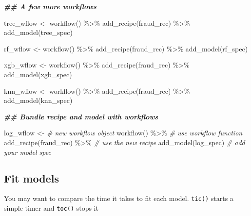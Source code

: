 \documentclass[
]{article}
\newenvironment{Shaded}{\begin{snugshade}}{\end{snugshade}}
\newcommand{\CommentTok}[1]{\textcolor[rgb]{0.56,0.35,0.01}{\textit{#1}}}
\newcommand{\DocumentationTok}[1]{\textcolor[rgb]{0.56,0.35,0.01}{\textbf{\textit{#1}}}}
\newcommand{\FunctionTok}[1]{\textcolor[rgb]{0.00,0.00,0.00}{#1}}
\newcommand{\NormalTok}[1]{#1}
\newcommand{\OtherTok}[1]{\textcolor[rgb]{0.56,0.35,0.01}{#1}}
\newcommand{\SpecialCharTok}[1]{\textcolor[rgb]{0.00,0.00,0.00}{#1}}
\begin{document}
\begin{Shaded}
\begin{Highlighting}[]
\DocumentationTok{\#\# A few more workflows}

\NormalTok{tree\_wflow }\OtherTok{\textless{}{-}}
 \FunctionTok{workflow}\NormalTok{() }\SpecialCharTok{\%\textgreater{}\%}
 \FunctionTok{add\_recipe}\NormalTok{(fraud\_rec) }\SpecialCharTok{\%\textgreater{}\%} 
 \FunctionTok{add\_model}\NormalTok{(tree\_spec) }

\NormalTok{rf\_wflow }\OtherTok{\textless{}{-}}
 \FunctionTok{workflow}\NormalTok{() }\SpecialCharTok{\%\textgreater{}\%}
 \FunctionTok{add\_recipe}\NormalTok{(fraud\_rec) }\SpecialCharTok{\%\textgreater{}\%} 
 \FunctionTok{add\_model}\NormalTok{(rf\_spec) }

\NormalTok{xgb\_wflow }\OtherTok{\textless{}{-}}
 \FunctionTok{workflow}\NormalTok{() }\SpecialCharTok{\%\textgreater{}\%}
 \FunctionTok{add\_recipe}\NormalTok{(fraud\_rec) }\SpecialCharTok{\%\textgreater{}\%} 
 \FunctionTok{add\_model}\NormalTok{(xgb\_spec)}

\NormalTok{knn\_wflow }\OtherTok{\textless{}{-}}
 \FunctionTok{workflow}\NormalTok{() }\SpecialCharTok{\%\textgreater{}\%}
 \FunctionTok{add\_recipe}\NormalTok{(fraud\_rec) }\SpecialCharTok{\%\textgreater{}\%} 
 \FunctionTok{add\_model}\NormalTok{(knn\_spec)}

\DocumentationTok{\#\# Bundle recipe and model with \textasciigrave{}workflows\textasciigrave{}}


\NormalTok{log\_wflow }\OtherTok{\textless{}{-}} \CommentTok{\# new workflow object}
 \FunctionTok{workflow}\NormalTok{() }\SpecialCharTok{\%\textgreater{}\%} \CommentTok{\# use workflow function}
 \FunctionTok{add\_recipe}\NormalTok{(fraud\_rec) }\SpecialCharTok{\%\textgreater{}\%}   \CommentTok{\# use the new recipe}
 \FunctionTok{add\_model}\NormalTok{(log\_spec)   }\CommentTok{\# add your model spec}
\end{Highlighting}
\end{Shaded}

\hypertarget{fit-models}{%
\subsection{Fit models}\label{fit-models}}

You may want to compare the time it takes to fit each model.
\texttt{tic()} starts a simple timer and \texttt{toc()} stops it
\end{document}
